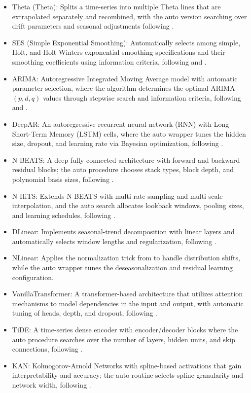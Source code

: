 \documentclass{article}
\begin{document}
\begin{itemize}
    \item Theta (Theta): Splits a time-series into multiple Theta lines that are extrapolated separately and recombined, with the auto version searching over drift parameters and seasonal adjustments following \cite{Assimakopoulos2000}.
    \item SES (Simple Exponential Smoothing): Automatically selects among simple, Holt, and Holt-Winters exponential smoothing specifications and their smoothing coefficients using information criteria, following \cite{Brown2004} and \cite{Winters1960}.
    \item ARIMA: Autoregressive Integrated Moving Average model with automatic parameter selection, where the algorithm determines the optimal ARIMA$(p,d,q)$ values through stepwise search and information criteria, following \cite{Box2013} and \cite{Hyndman2008}.
    \item DeepAR: An autoregressive recurrent neural network (RNN) with Long Short-Term Memory (LSTM) cells, where the auto wrapper tunes the hidden size, dropout, and learning rate via Bayesian optimization, following \cite{Salinas2020}.
    \item N-BEATS: A deep fully-connected architecture with forward and backward residual blocks; the auto procedure chooses stack types, block depth, and polynomial basis sizes, following \cite{Oreshkin2020}.
    \item N-HiTS: Extends N-BEATS with multi-rate sampling and multi-scale interpolation, and the auto search allocates lookback windows, pooling sizes, and learning schedules, following \cite{Challu2022}.
    \item DLinear: Implements seasonal-trend decomposition with linear layers and automatically selects window lengths and regularization, following \cite{Zeng2022}.
    \item NLinear: Applies the normalization trick from \cite{Zeng2022} to handle distribution shifts, while the auto wrapper tunes the deseasonalization and residual learning configuration.
    \item VanillaTransformer: A transformer-based architecture that utilizes attention mechanisms to model dependencies in the input and output, with automatic tuning of heads, depth, and dropout, following \cite{Vaswani2017}.
    \item TiDE: A time-series dense encoder with encoder/decoder blocks where the auto procedure searches over the number of layers, hidden units, and skip connections, following \cite{Das2023a}.
    \item KAN: Kolmogorov-Arnold Networks with spline-based activations that gain interpretability and accuracy; the auto routine selects spline granularity and network width, following \cite{Liu2025}.
\end{itemize}
\end{document}
